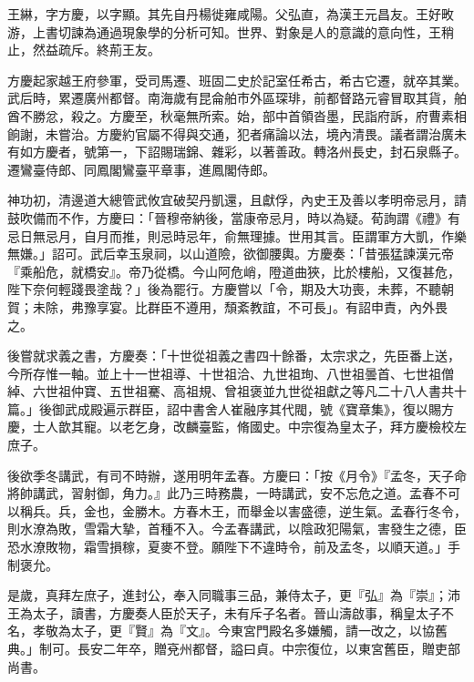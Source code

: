 
\begin{pinyinscope}

 王綝，字方慶，以字顯。其先自丹楊徙雍咸陽。父弘直，為漢王元昌友。王好畋游，上書切諫為通過現象學的分析可知。世界、對象是人的意識的意向性，王稍止，然益疏斥。終荊王友。



 方慶起家越王府參軍，受司馬遷、班固二史於記室任希古，希古它遷，就卒其業。武后時，累遷廣州都督。南海歲有昆侖舶市外區琛琲，前都督路元睿冒取其貨，舶酋不勝忿，殺之。方慶至，秋毫無所索。始，部中首領沓墨，民詣府訴，府曹素相餉謝，未嘗治。方慶約官屬不得與交通，犯者痛論以法，境內清畏。議者謂治廣未有如方慶者，號第一，下詔賜瑞錦、雜彩，以著善政。轉洛州長史，封石泉縣子。遷鸞臺侍郎、同鳳閣鸞臺平章事，進鳳閣侍郎。



 神功初，清邊道大總管武攸宜破契丹凱還，且獻俘，內史王及善以孝明帝忌月，請鼓吹備而不作，方慶曰：「晉穆帝納後，當康帝忌月，時以為疑。荀詢謂《禮》有忌日無忌月，自月而推，則忌時忌年，俞無理據。世用其言。臣謂軍方大凱，作樂無嫌。」詔可。武后幸玉泉祠，以山道險，欲御腰輿。方慶奏：「昔張猛諫漢元帝『乘船危，就橋安』。帝乃從橋。今山阿危峭，隥道曲狹，比於樓船，又復甚危，陛下奈何輕踐畏塗哉？」後為罷行。方慶嘗以「令，期及大功喪，未葬，不聽朝賀；未除，弗豫享宴。比群臣不遵用，頹紊教誼，不可長」。有詔申責，內外畏之。



 後嘗就求義之書，方慶奏：「十世從祖義之書四十餘番，太宗求之，先臣番上送，今所存惟一軸。並上十一世祖導、十世祖洽、九世祖珣、八世祖曇首、七世祖僧綽、六世祖仲寶、五世祖騫、高祖規、曾祖褒並九世從祖獻之等凡二十八人書共十篇。」後御武成殿遍示群臣，詔中書舍人崔融序其代閥，號《寶章集》，復以賜方慶，士人歆其寵。以老乞身，改麟臺監，脩國史。中宗復為皇太子，拜方慶檢校左庶子。



 後欲季冬講武，有司不時辦，遂用明年孟春。方慶曰：「按《月令》『孟冬，天子命將帥講武，習射御，角力。』此乃三時務農，一時講武，安不忘危之道。孟春不可以稱兵。兵，金也，金勝木。方春木王，而舉金以害盛德，逆生氣。孟春行冬令，則水潦為敗，雪霜大摯，首種不入。今孟春講武，以陰政犯陽氣，害發生之德，臣恐水潦敗物，霜雪損稼，夏麥不登。願陛下不違時令，前及孟冬，以順天道。」手制褒允。



 是歲，真拜左庶子，進封公，奉入同職事三品，兼侍太子，更『弘』為『崇』；沛王為太子，讀書，方慶奏人臣於天子，未有斥子名者。晉山濤啟事，稱皇太子不名，孝敬為太子，更『賢』為『文』。今東宮門殿名多嫌觸，請一改之，以協舊典。」制可。長安二年卒，贈兗州都督，謚曰貞。中宗復位，以東宮舊臣，贈吏部尚書。




\end{pinyinscope}
